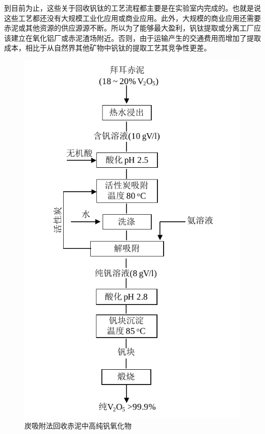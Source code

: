 到目前为止，这些关于回收钒钛的工艺流程都主要是在实验室内完成的。也就是说这些工艺都还没有大规模工业化应用或商业应用。此外，大规模的商业应用还需要赤泥或其他资源的供应源源不断。所以为了能够最大盈利，钒钛提取或分离工厂应该建立在氧化铝厂或赤泥渣场附近。否则，由于运输产生的交通费用而增加了提取成本，相比于从自然界其他矿物中钒钛的提取工艺其竞争性更差。
\begin{figure}[!h]
	\centering
	\includegraphics[width=0.65\linewidth]{Figures/c1/Figure10}%
	\caption{炭吸附法回收赤泥中高纯钒氧化物}\label{recoveringV2O5}
\end{figure}

